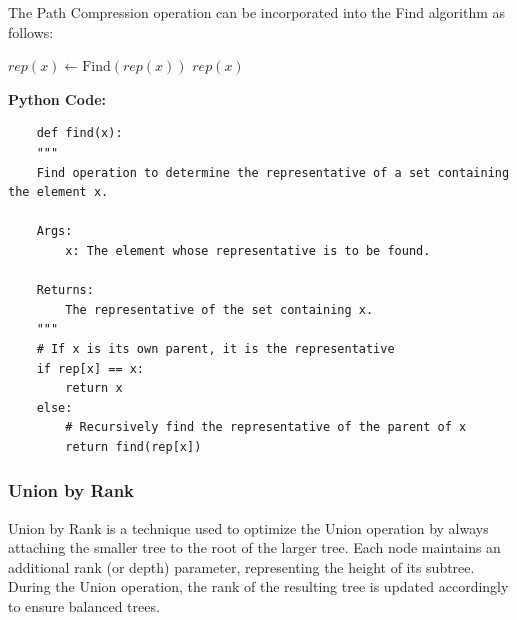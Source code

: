 \documentclass[12pt]{book} %
\begin{document}
The Path Compression operation can be incorporated into the Find algorithm as follows:
\FloatBarrier
\begin{algorithm}[H]
\caption{Find(\(x\)) with Path Compression}
\begin{algorithmic}[1]
        \State \(rep(x) \gets \text{Find}(rep(x))\)
    \EndIf
    \State \Return \(rep(x)\)
\EndFunction
\end{algorithmic}
\end{algorithm}
\FloatBarrier
\textbf{Python Code:}
\FloatBarrier
\begin{lstlisting}
    def find(x):
    """
    Find operation to determine the representative of a set containing the element x.
    
    Args:
        x: The element whose representative is to be found.
    
    Returns:
        The representative of the set containing x.
    """
    # If x is its own parent, it is the representative
    if rep[x] == x:
        return x
    else:
        # Recursively find the representative of the parent of x
        return find(rep[x])
\end{lstlisting}
\subsubsection{Union by Rank}

Union by Rank is a technique used to optimize the Union operation by always attaching the smaller tree to the root of the larger tree. Each node maintains an additional rank (or depth) parameter, representing the height of its subtree. During the Union operation, the rank of the resulting tree is updated accordingly to ensure balanced trees.
\end{document}
